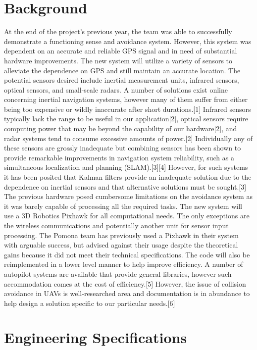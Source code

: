 \documentclass[12pt]{article}
\begin{document}
\section{Background}
	At the end of the project's previous year, the team was able to successfully demonstrate a functioning sense and avoidance system. However, this system was dependent on an accurate and reliable GPS signal and in need of substantial hardware improvements.
	The new system will utilize a variety of sensors to alleviate the dependence on GPS and still maintain an accurate location. The potential sensors desired include inertial measurement units, infrared sensors, optical sensors, and small-scale radars. A number of solutions exist online concerning inertial navigation systems, however many of them suffer from either being too expensive or wildly inaccurate after short durations.[1] Infrared sensors typically lack the range to be useful in our application[2], optical sensors require computing power that may be beyond the capability of our hardware[2], and radar systems tend to consume excessive amounts of power.[2] Individually any of these sensors are grossly inadequate but combining sensors has been shown to provide remarkable improvements in navigation system reliability, such as a simultaneous localization and planning (SLAM).[3][4] However, for such systems it has been posited that Kalman filters provide an inadequate solution due to the dependence on inertial sensors and that alternative solutions must be sought.[3]
	The previous hardware posed cumbersome limitations on the avoidance system as it was barely capable of processing all the required tasks. The new system will use a 3D Robotics Pixhawk for all computational needs. The only exceptions are the wireless communications and potentially another unit for sensor input processing. The Pomona team has previously used a Pixhawk in their system with arguable success, but advised against their usage despite the theoretical gains because it did not meet their technical specifications. The code will also be reimplemented in a lower level manner to help improve efficiency. A number of autopilot systems are available that provide general libraries, however such accommodation comes at the cost of efficiency.[5] However, the issue of collision avoidance in UAVs is well-researched area and documentation is in abundance to help design a solution specific to our particular needs.[6]

\section{Engineering Specifications}
\end{document}

